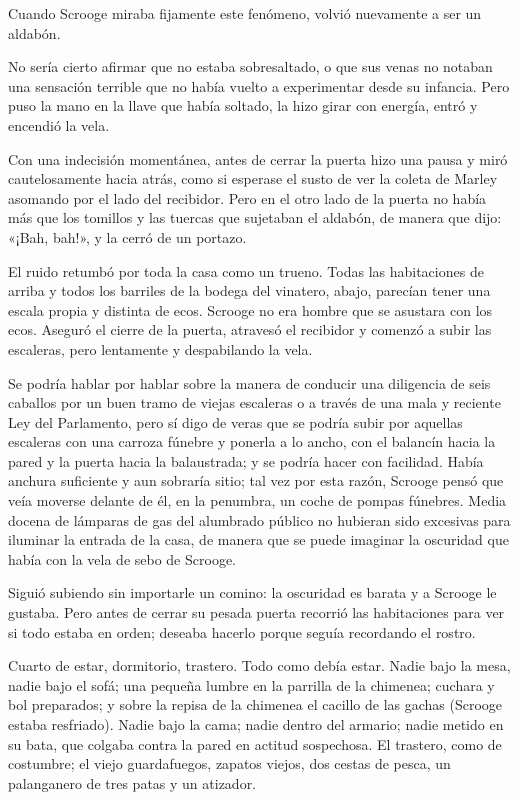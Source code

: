 \documentclass{novela}
\begin{document}
 Cuando Scrooge miraba fijamente este fenómeno, volvió nuevamente a ser un aldabón.

 No sería cierto afirmar que no estaba sobresaltado, o que sus venas no notaban una sensación terrible que no había vuelto a experimentar desde su infancia. Pero puso la mano en la llave que había soltado, la hizo girar con energía, entró y encendió la vela.

 Con una indecisión momentánea, antes de cerrar la puerta hizo una pausa y miró cautelosamente hacia atrás, como si esperase el susto de ver la coleta de Marley asomando por el lado del recibidor. Pero en el otro lado de la puerta no había más que los tomillos y las tuercas que sujetaban el aldabón, de manera que dijo: «¡Bah, bah!», y la cerró de un portazo.

 El ruido retumbó por toda la casa como un trueno. Todas las habitaciones de arriba y todos los barriles de la bodega del vinatero, abajo, parecían tener una escala propia y distinta de ecos. Scrooge no era hombre que se asustara con los ecos. Aseguró el cierre de la puerta, atravesó el recibidor y comenzó a subir las escaleras, pero lentamente y despabilando la vela.

 Se podría hablar por hablar sobre la manera de conducir una diligencia de seis caballos por un buen tramo de viejas escaleras o a través de una mala y reciente Ley del Parlamento, pero sí digo de veras que se podría subir por aquellas escaleras con una carroza fúnebre y ponerla a lo ancho, con el balancín hacia la pared y la puerta hacia la balaustrada; y se podría hacer con facilidad. Había anchura suficiente y aun sobraría sitio; tal vez por esta razón, Scrooge pensó que veía moverse delante de él, en la penumbra, un coche de pompas fúnebres. Media docena de lámparas de gas del alumbrado público no hubieran sido excesivas para iluminar la entrada de la casa, de manera que se puede imaginar la oscuridad que había con la vela de sebo de Scrooge.

 Siguió subiendo sin importarle un comino: la oscuridad es barata y a Scrooge le gustaba. Pero antes de cerrar su pesada puerta recorrió las habitaciones para ver si todo estaba en orden; deseaba hacerlo porque seguía recordando el rostro.

 Cuarto de estar, dormitorio, trastero. Todo como debía estar. Nadie bajo la mesa, nadie bajo el sofá; una pequeña lumbre en la parrilla de la chimenea; cuchara y bol preparados; y sobre la repisa de la chimenea el cacillo de las gachas (Scrooge estaba resfriado). Nadie bajo la cama; nadie dentro del armario; nadie metido en su bata, que colgaba contra la pared en actitud sospechosa. El trastero, como de costumbre; el viejo guardafuegos, zapatos viejos, dos cestas de pesca, un palanganero de tres patas y un atizador.
\end{document}
